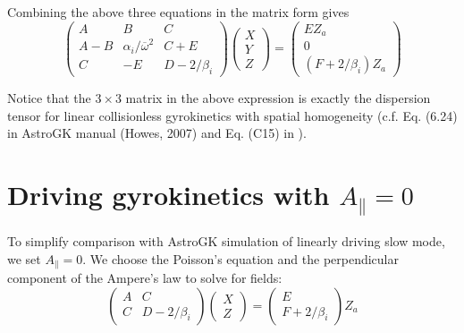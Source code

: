 \documentclass[12pt]{article}
\begin{document}
Combining the above three equations in the matrix form gives
\begin{equation}
\begin{pmatrix}
A & B & C \\
A-B & \alpha_i/\overline{\omega}^2 & C + E \\
C & -E & D- 2/\beta_i 
\end{pmatrix}
\begin{pmatrix}
 X\\
 Y\\
 Z
\end{pmatrix}
=
\begin{pmatrix}
EZ_a \\
0\\
(F + 2/\beta_i) Z_a
\end{pmatrix}
\label{eq:general_disp_equation}
\end{equation}

Notice that the $3\times 3$  matrix in the above expression is exactly the dispersion tensor for linear collisionless gyrokinetics with spatial homogeneity (c.f. Eq. (6.24) in AstroGK manual (Howes, 2007) and Eq. (C15) in \cite{Howes:2006a}).

\section{Driving gyrokinetics with $A_\parallel = 0$}
To simplify comparison with AstroGK simulation of linearly driving slow mode, we set $A_\parallel=0$. We choose the Poisson's equation and the perpendicular component of the Ampere's law to solve for fields:
%
\begin{equation}
\begin{pmatrix}
A & C\\
C & D-2/\beta_i 
\end{pmatrix}
\begin{pmatrix}
X \\
Z
\end{pmatrix}
=
\begin{pmatrix}
E \\
F + 2/\beta_i
\end{pmatrix}
Z_a
\end{equation}
\end{document}
